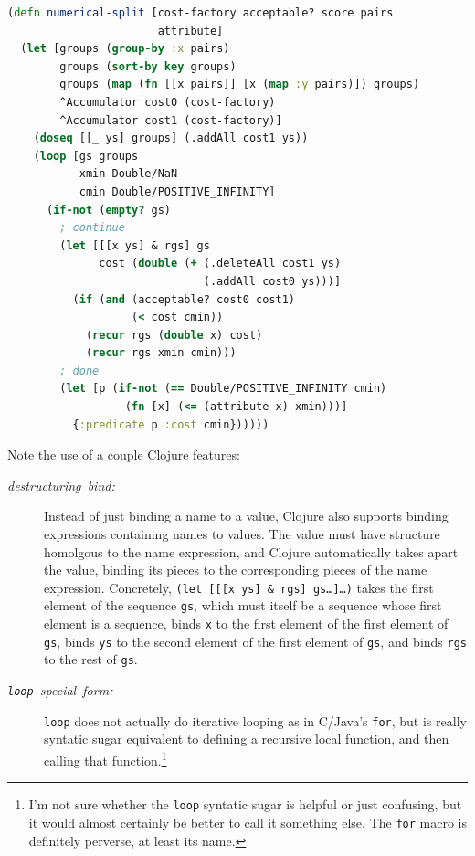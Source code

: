 \documentclass[10pt,openany]{article}
\numberwithin{definition}{section}
\numberwithin{example}{section}
\numberwithin{equation}{section}
\numberwithin{figure}{section}
\begin{document}
\begin{minipage}[t]{1\columnwidth}%
\begin{lstlisting}[caption={Optimal split on a numerical attribute},label={lis:numerical-split},language=clojure,tabsize=2]
(defn numerical-split [cost-factory acceptable? score pairs
                       attribute]
  (let [groups (group-by :x pairs)
        groups (sort-by key groups)
        groups (map (fn [[x pairs]] [x (map :y pairs)]) groups)
        ^Accumulator cost0 (cost-factory)
        ^Accumulator cost1 (cost-factory)]
    (doseq [[_ ys] groups] (.addAll cost1 ys))
    (loop [gs groups
           xmin Double/NaN
           cmin Double/POSITIVE_INFINITY]
      (if-not (empty? gs)
        ; continue
        (let [[[x ys] & rgs] gs
              cost (double (+ (.deleteAll cost1 ys) 
                              (.addAll cost0 ys)))]
          (if (and (acceptable? cost0 cost1)
                   (< cost cmin)) 
            (recur rgs (double x) cost)
            (recur rgs xmin cmin)))
        ; done         
        (let [p (if-not (== Double/POSITIVE_INFINITY cmin)
                  (fn [x] (<= (attribute x) xmin)))]
          {:predicate p :cost cmin}))))) 
\end{lstlisting}
%
\end{minipage}

Note the use of a couple Clojure features:
\begin{description}
\item [{\emph{destructuring~bind:}}] Instead of just binding a name to
a value, Clojure also supports binding expressions containing names
to values. The value must have structure homolgous to the name expression,
and Clojure automatically takes apart the value, binding its pieces
to the corresponding pieces of the name expression. Concretely, \texttt{(let~{[}{[}{[}x
ys{]}~\&~rgs{]}~gs\ldots{}{]}\ldots{})} takes the first element
of the sequence \texttt{gs}, which must itself be a sequence whose
first element is a sequence, binds \texttt{x} to the first element
of the first element of \texttt{gs}, binds \texttt{ys} to the second
element of the first element of \texttt{gs}, and binds \texttt{rgs}
to the rest of \texttt{gs}.
\item [{\texttt{\emph{loop}}\emph{~special~form:}}] \texttt{loop} does
not actually do iterative looping as in C/Java's \texttt{for}, but
is really syntatic sugar equivalent to defining a recursive local
function, and then calling that function.\footnote{I'm not sure whether the \texttt{loop} syntatic sugar is helpful or
just confusing, but it would almost certainly be better to call it
something else. The \texttt{for} macro is definitely perverse, at
least its name.} 
\end{description}
\end{document}
